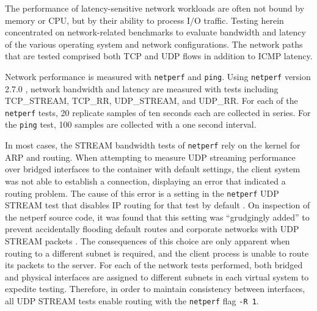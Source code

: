 %

The performance of latency-sensitive network workloads are often not bound by memory or CPU, but by their ability to process I/O traffic.
Testing herein concentrated on network-related benchmarks to evaluate bandwidth and latency of the various operating system and network configurations.
The network paths that are tested comprised both TCP and UDP flows in addition to ICMP latency.

Network performance is measured with \texttt{netperf} \autocite{netperfHome} and \texttt{ping}. 
Using \texttt{netperf} version 2.7.0 \autocite{netperfManual, netperfsource}, network bandwidth and latency are measured with tests including TCP\_STREAM, TCP\_RR, UDP\_STREAM, and UDP\_RR.
For each of the \texttt{netperf} tests, 20 replicate samples of ten seconds each are collected in series.  For the \texttt{ping} test, 100 samples are collected with a one second interval.  

In most cases, the STREAM bandwidth tests of \texttt{netperf} rely on the kernel for ARP and routing.  
When attempting to measure UDP streaming performance over bridged interfaces to the container with default settings, the client system was not able to establish a connection, displaying an error that indicated a routing problem.
The cause of this error is a setting in the \texttt{netperf} UDP STREAM test that disables IP routing for that test by default \autocite{stackoverflownetperf, netperfsource}.  
On inspection of the netperf source code, it was found that this setting was ``grudgingly added'' to prevent accidentally flooding default routes and corporate networks with UDP STREAM packets \autocite{netperfsource}.
The consequences of this choice are only apparent when routing to a different subnet is required, and the client process is unable to route its packets to the server.
For each of the network tests performed, both bridged and physical interfaces are assigned to different subnets in each virtual system to expedite testing.
Therefore, in order to maintain consistency between interfaces, all UDP STREAM tests enable routing with the \texttt{netperf} flag \texttt{-R 1}.


